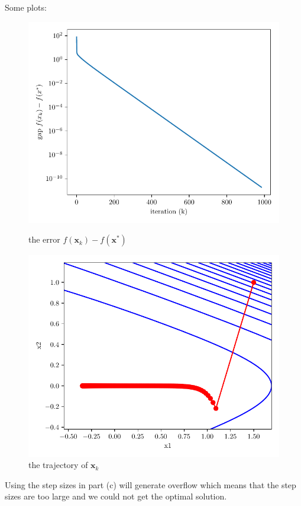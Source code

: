 \documentclass{article}
\def\bx{\boldsymbol{x}}
\begin{document}
\begin{enumerate}[(a)]
		Some plots:
		\begin{figure}[H]
			\centering
			\begin{minipage}[b]{0.46\linewidth}
				\includegraphics[width=1\linewidth]
				{p1de/gd_error_css0.005.pdf}
				\caption*{the error $f(\bx_k) - f(\bx^*)$}
			\end{minipage}
			\begin{minipage}[b]{0.46\linewidth}
				\includegraphics[width=1\linewidth]
				{p1de/gd_traces_css0.005.pdf}
				\caption*{the trajectory of $\bx_k$}
			\end{minipage}
		\end{figure}
		Using the step sizes in part (c) will generate overflow which means that the step sizes are too large and we could not get the optimal solution.
\end{enumerate}
\end{document}
